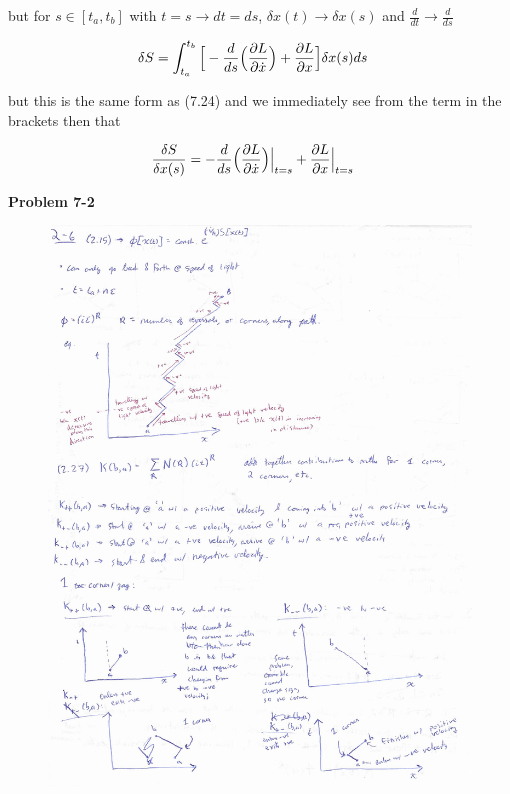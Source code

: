 \documentclass{article}
\begin{document}
but for $s \in [t_{a}, t_{b}]$ with $t = s \rightarrow dt = ds$, $\delta x(t) \rightarrow \delta x(s)$ and $\frac{d}{dt} \rightarrow \frac{d}{ds}$ 

\begin{align*}
         \delta S &=  \int_{t_{a}}^{t_{b}} \Big[ -\frac{d}{ds} \Big( \pdv{L}{\dot{x}} \Big) +  \pdv{L}{x} \Big]\delta x(s) ds 
\end{align*}

but this is the same form as (7.24) and we immediately see from the term in the brackets then that 

\begin{align*}
         \frac{\delta S}{\delta x(s)} &=-\frac{d}{ds}\Big( \pdv{L}{\dot{x}} \Big)\Big|_{t=s} + \pdv{L}{x}\Big|_{t=s}
\end{align*}


\textbf{Problem 7-2}




\begin{figure}[t]
\includegraphics[width=15cm]{FeynmanQ2dash6p1.png}
\end{figure}
\end{document}
